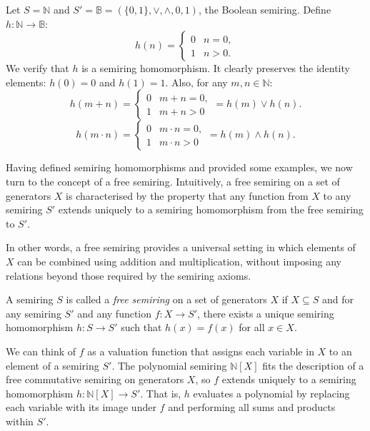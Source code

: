 \documentclass[oneside, 11pt]{amsbook}
\theoremstyle{plain}
\theoremstyle{definition}
\theoremstyle{remark}
\begin{document}
\begin{exmpl}
    Let $S = \mathbb{N}$ and $S' = \mathbb{B} = (\{0,1\}, \lor, \land, 0, 1)$, the Boolean semiring. Define $h : \mathbb{N} \to \mathbb{B}$:
    \[
        h(n) =
        \begin{cases}
            0 & n = 0, \\
            1 & n > 0.
        \end{cases}
    \]
    We verify that $h$ is a semiring homomorphism. It clearly preserves the identity elements: $h(0) = 0$ and $h(1) = 1$. Also, for any $m,n \in \mathbb{N}$:
    \[
        h(m+n) =
        \begin{cases}
            0 & m+n = 0, \\
            1 & m+n > 0
        \end{cases} = h(m) \lor h(n).
    \]
    \[
        h(m \cdot n) =
        \begin{cases}
            0 & m \cdot n = 0, \\
            1 & m \cdot n > 0
        \end{cases} = h(m) \land h(n).
    \]
\end{exmpl}

Having defined semiring homomorphisms and provided some examples, we now turn to the concept of a free semiring. Intuitively, a free semiring on a set of generators $X$ is characterised by the property that any function from $X$ to any semiring $S'$ extends uniquely to a semiring homomorphism from the free semiring to $S'$.

In other words, a free semiring provides a universal setting in which elements of $X$ can be combined using addition and multiplication, without imposing any relations beyond those required by the semiring axioms.

\begin{defn}
    A semiring $S$ is called a \emph{free semiring} on a set of generators $X$ if $X \subseteq S$ and for any semiring $S'$ and any function $f : X \to S'$, there exists a unique semiring homomorphism $h : S \to S'$ such that $h(x) = f(x)$ for all $x \in X$.
\end{defn}

We can think of $f$ as a valuation function that assigns each variable in $X$ to an element of a semiring $S'$. The polynomial semiring $\mathbb{N}[X]$ fits the description of a free commutative semiring on generators $X$, so $f$ extends uniquely to a semiring homomorphism $h : \mathbb{N}[X] \to S'$. That is, $h$ evaluates a polynomial by replacing each variable with its image under $f$ and performing all sums and products within $S'$.
\end{document}
